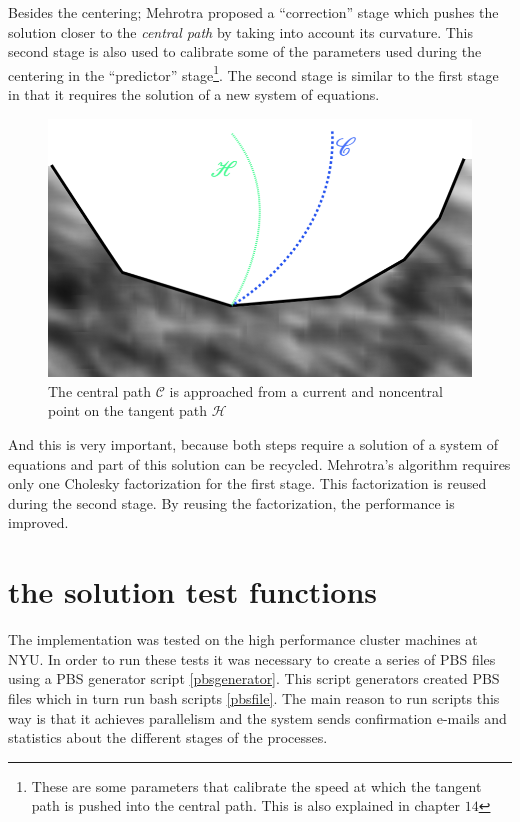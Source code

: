Besides the centering; Mehrotra proposed a ``correction'' stage which pushes the solution closer to the \emph{central path} by taking into account its curvature. This second stage is also used to calibrate some of the parameters used during the centering in the ``predictor'' stage\footnote{These are some parameters that calibrate the speed at which the tangent path is pushed into the central path. This is also explained in chapter $14$\citep{nocedal}}. The second stage is similar to the first stage in that it requires the solution of a new system of equations.

\begin{figure}
\begin{center}
\includegraphics[scale=0.3]{Figures/CentralPath.png}
\caption[The Central Path and the Tangent Path]{The central path $\mathcal{C}$ is approached from a current and noncentral point on the tangent path $\mathcal{H}$}
\end{center}
\end{figure}

And this is very important, because both steps require a solution of a system of equations and part of this solution can be recycled. Mehrotra's algorithm requires only one Cholesky factorization for the first stage. This factorization is reused during the second stage. By reusing the factorization, the performance is improved.

\chapter{the solution test functions}

The implementation was tested on the high performance cluster machines at NYU. In order to run these tests it was necessary to create a series of PBS files using a PBS generator script \ref{pbsgenerator}. This script generators created PBS files which in turn run bash scripts \ref{pbsfile}. The main reason to run scripts this way is that it achieves parallelism and the system sends confirmation e-mails and statistics about the different stages of the processes.


